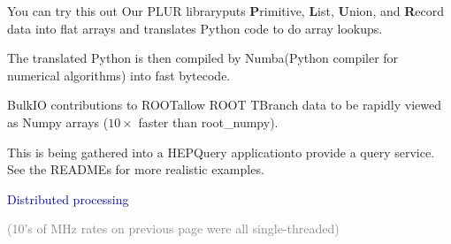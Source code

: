 \documentclass{beamer}
\begin{document}
\begin{frame}{You can try this out}
Our PLUR library\footnotemark[1] puts {\bf P}rimitive, {\bf L}ist, {\bf U}nion, and {\bf R}ecord data into flat arrays and translates Python code to do array lookups.

\vspace{0.5 cm}
The translated Python is then compiled by Numba\footnotemark[2] (Python compiler for numerical algorithms) into fast bytecode.

\vspace{0.5 cm}
BulkIO contributions to ROOT\footnotemark[3] allow ROOT TBranch data to be rapidly viewed as Numpy arrays ($10\times$ faster than root\_numpy).

\vspace{0.5 cm}
This is being gathered into a HEPQuery application\footnotemark[4] to provide a query service. See the READMEs for more realistic examples.

\end{frame}

\begin{frame}
\begin{center}
\huge \textcolor{darkblue}{Distributed processing}

\vspace{0.75 cm}
\normalsize\textcolor{gray}{(10's of MHz rates on previous page were all single-threaded)}
\end{center}
\end{frame}
\end{document}
